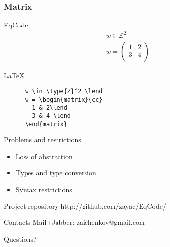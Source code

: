 \documentclass[xcolor=dvipsnames,mathserif,professionalfont,12pt]{beamer}
\begin{document}
\begin{frame}[fragile]
  \frametitle{Matrix}
    \begin{block}{EqCode}
      \begin{align*}
      w \in \mathbb{Z}^2 \\
      w = \left(
        \begin{array}{cc}
        1 & 2\\
        3 & 4 \\
      \end{array}
      \right)
      \end{align*}
    \end{block}
      \begin{block}{\LaTeX}
      \begin{lstlisting}
      w \in \type{Z}^2 \lend
      w = \begin{matrix}{cc}
        1 & 2\lend
        3 & 4 \lend
      \end{matrix}
      \end{lstlisting}
    \end{block}
\end{frame}

\begin{frame}{Problems and restrictions}
  \begin{itemize}
    \item Loss of abstraction
    \item Types and type conversion
    \item Syntax restrictions
  \end{itemize}
\end{frame}


\begin{frame}
  \begin{block}{Project repository}
    http://github.com/zayac/EqCode/
  \end{block}
  \begin{block}{Contacts}
    Mail+Jabber: zaichenkov@gmail.com
  \end{block}
\begin{center} Questions? \end{center}
\end{frame}
\end{document}
